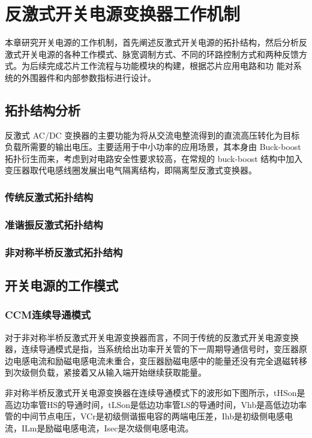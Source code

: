 \chapter{反激式开关电源变换器工作机制}
本章研究开关电源的工作机制，首先阐述反激式开关电源的拓扑结构，然后分析反激式开关电源的各种工作模式、脉宽调制方式、不同的环路控制方式和两种反馈方式。为后续完成芯片工作流程与功能模块的构建，根据芯片应用电路和功 能对系统的外围器件和内部参数指标进行设计。

\section{拓扑结构分析}
反激式 AC/DC 变换器的主要功能为将从交流电整流得到的直流高压转化为目标 负载所需要的输出电压。主要适用于中小功率的应用场景，其本身由 Buck-boost 拓扑衍生而来，考虑到对电路安全性要求较高，在常规的 buck-boost 结构中加入变压器取代电感线圈发展出电气隔离结构，即隔离型反激式变换器。
\subsection{传统反激式拓扑结构}

\subsection{准谐振反激式拓扑结构}
                

\subsection{非对称半桥反激式拓扑结构}

\section{开关电源的工作模式}
\label{sec:dataset-build}
\subsection{CCM连续导通模式}
对于非对称半桥反激式开关电源变换器而言，不同于传统的反激式开关电源变换器，连续导通模式是指，当系统给出功率开关管的下一周期导通信号时，变压器原边电感电流和励磁电感电流未重合，变压器励磁电感中的能量还没有完全退磁转移到次级侧负载，紧接着又从输入端开始继续获取能量。

非对称半桥反激式开关电源变换器在连续导通模式下的波形如下图所示，tHSon是高边功率管HS的导通时间，tLSon是低边功率管LS的导通时间，Vhb是高低边功率管的中间节点电压，VCr是初级侧谐振电容的两端电压差，Ihb是初级侧电感电流，ILm是励磁电感电流，Isec是次级侧电感电流。

